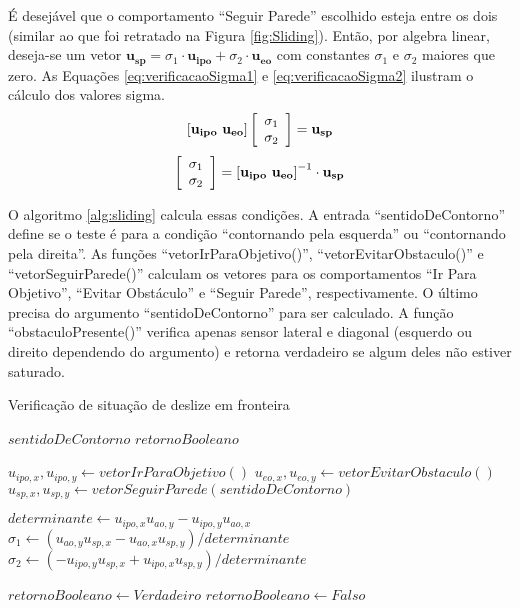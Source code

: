 		É desejável que o comportamento ``Seguir Parede'' escolhido esteja entre os dois 
		(similar ao que foi retratado na Figura \ref{fig:Sliding}). Então, por algebra linear, 
		deseja-se um vetor $\mathbf{u_{sp}} = \sigma_1 \cdot \mathbf{u_{ipo}} + \sigma_2 \cdot \mathbf{u_{eo}}$
		com constantes $\sigma_1$ e $\sigma_2$ maiores que zero. As Equações 
		\ref{eq:verificacaoSigma1} e \ref{eq:verificacaoSigma2} ilustram o cálculo dos valores 
		sigma. 
		\begin{equation}
			\label{eq:verificacaoSigma1}
			\left[\mathbf{u_{ipo}} \ \mathbf{u_{eo}}\right] 
			\mleft[ 
			\begin{array}{c c}
			\sigma_1 \\ \sigma_2
			\end{array}
			\mright]
			= \mathbf{u_{sp}}
		\end{equation}
		\begin{equation}
			\label{eq:verificacaoSigma2}
			\mleft[ 
			\begin{array}{c c}
			\sigma_1 \\ \sigma_2
			\end{array}
			\mright] = \left[\mathbf{u_{ipo}} \ \mathbf{u_{eo}}\right]^{-1} \cdot \mathbf{u_{sp}}
		\end{equation}
		  
		O algoritmo \ref{alg:sliding} calcula essas condições. A entrada ``sentidoDeContorno''
		define se o teste é para a condição ``contornando pela esquerda'' ou ``contornando pela
		direita''. As funções ``vetorIrParaObjetivo()'', ``vetorEvitarObstaculo()'' e 
		``vetorSeguirParede()'' calculam os vetores para os comportamentos ``Ir Para Objetivo'',
		``Evitar Obstáculo'' e ``Seguir Parede'', respectivamente. O último precisa do argumento
		``sentidoDeContorno'' para ser calculado. A função ``obstaculoPresente()'' verifica 
		apenas sensor lateral e diagonal (esquerdo ou direito dependendo do argumento) e retorna
		verdadeiro se algum deles não estiver saturado.
		\begin{algorithm}
		\caption{Verificação de situação de deslize em fronteira}
		\label{alg:sliding}%
		\begin{algorithmic}[1]
	
		\REQUIRE $sentidoDeContorno$
		\ENSURE $retornoBooleano$
	
		\STATE $u_{ipo, x}, u_{ipo, y} \leftarrow vetorIrParaObjetivo()$ 
		\STATE $u_{eo, x}, u_{eo, y} \leftarrow vetorEvitarObstaculo()$
		\STATE $u_{sp, x}, u_{sp, y} \leftarrow vetorSeguirParede(sentidoDeContorno)$
		
		\STATE $determinante \leftarrow u_{ipo, x} u_{ao, y} - u_{ipo, y} u_{ao, x}$
		\STATE $\sigma_1 \leftarrow (u_{ao, y} u_{sp, x} - u_{ao, x} u_{sp, y})/determinante$
		\STATE $\sigma_2 \leftarrow (-u_{ipo, y} u_{sp, x} + u_{ipo, x} u_{sp, y})/determinante$
		
			\STATE $retornoBooleano \leftarrow Verdadeiro$
		\ELSE
			\STATE $retornoBooleano \leftarrow Falso$
		\ENDIF
	
		\end{algorithmic}
		\end{algorithm}
		
